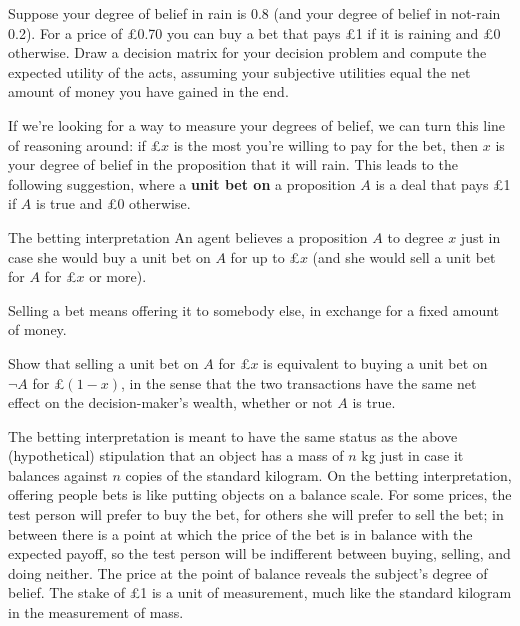 \begin{exercise}{1}
  Suppose your degree of belief in rain is $0.8$ (and your degree of
  belief in not-rain 0.2). For a price of £0.70 you can buy a bet that
  pays £1 if it is raining and £0 otherwise. Draw a decision
  matrix for your decision problem and compute the expected utility of
  the acts, assuming your subjective utilities equal the net amount of
  money you have gained in the end.
\end{exercise}

If we're looking for a way to measure your degrees of belief, we can turn this
line of reasoning around: if £$x$ is the most you're willing to pay for the bet,
then $x$ is your degree of belief in the proposition that it will rain. This
leads to the following suggestion, where a \textbf{unit bet on} a proposition
$A$ is a deal that pays £1 if $A$ is true and £0 otherwise.

\begin{genericthm}{The betting interpretation}
  An agent believes a proposition $A$ to degree $x$ just in case she would buy a
  unit bet on $A$ for up to £$x$ (and she would sell a unit bet for $A$ for £$x$
  or more).
\end{genericthm}
%
Selling a bet means offering it to somebody else, in exchange for a fixed amount
of money.

\begin{exercise}{2}
  Show that selling a unit bet on $A$ for £$x$ is equivalent to buying a unit
  bet on $\neg A$ for £$(1-x)$, in the sense that the two transactions have the
  same net effect on the decision-maker's wealth, whether or not $A$ is true.
  

  
\end{exercise}

The betting interpretation is meant to have the same status as the above
(hypothetical) stipulation that an object has a mass of $n$ kg just in case it
balances against $n$ copies of the standard kilogram. On the betting
interpretation, offering people bets is like putting objects on a balance scale.
For some prices, the test person will prefer to buy the bet, for others she will
prefer to sell the bet; in between there is a point at which the price of the
bet is in balance with the expected payoff, so the test person will be
indifferent between buying, selling, and doing neither. The price at the point
of balance reveals the subject's degree of belief. The stake of £1 is a unit of
measurement, much like the standard kilogram in the measurement of mass.

